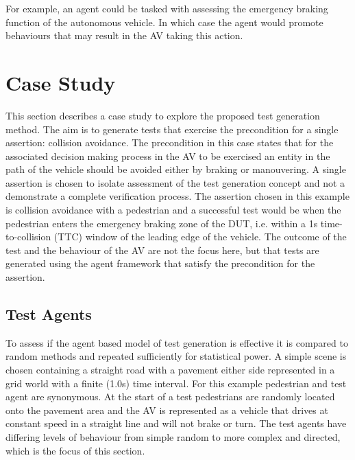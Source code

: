 \documentclass[letterpaper, 10 pt, journal, twoside]{IEEEtran}
\begin{document}
For example, an agent could be tasked with assessing the emergency braking function of the autonomous vehicle. In which case the agent would promote behaviours that may result in the AV taking this action. %


%
%



\section{Case Study}
 
This section describes a case study to explore the proposed test generation method. The aim is to generate tests that exercise the precondition for a single assertion: collision avoidance. The precondition in this case states that for the associated decision making process in the AV to be exercised an entity in the path of the vehicle should be avoided either by braking or manouvering.  A single assertion is chosen to isolate assessment of the test generation concept and not a demonstrate a complete verification process. The assertion chosen in this example is collision avoidance with a pedestrian and a successful test would be when the pedestrian enters the emergency braking zone of the DUT, i.e. within a 1s time-to-collision (TTC) window of the leading edge of the vehicle. The outcome of the test and the behaviour of the AV are not the focus here, but that tests are generated using the agent framework that satisfy the precondition for the assertion. 

\subsection{Test Agents}
To assess if the agent based model of test generation is effective it is compared to random methods and repeated sufficiently for statistical power. A simple scene is chosen containing a straight road with a pavement either side represented in a grid world with a finite (1.0s) time interval. For this example pedestrian and test agent are synonymous. At the start of a test pedestrians are randomly located onto the pavement area and the AV is represented as a vehicle that drives at constant speed in a straight line and will not brake or turn. The test agents have differing levels of behaviour from simple random to more complex and directed, which is the focus of this section. 
\end{document}
